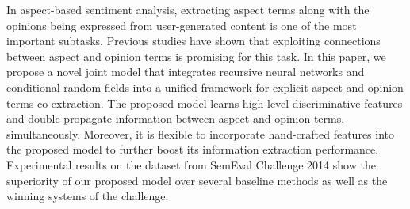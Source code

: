 In aspect-based sentiment analysis, extracting aspect terms along with the opinions being expressed from user-generated content is one of the most important subtasks. Previous studies have shown that exploiting connections between aspect and opinion terms is promising for this task. In this paper, we propose a novel joint model that integrates recursive neural networks and conditional random fields into a unified framework for explicit aspect and opinion terms co-extraction. The proposed model learns high-level discriminative features and double propagate information between aspect and opinion terms, simultaneously. Moreover, it is flexible to incorporate hand-crafted features into the proposed model to further boost its information extraction performance. Experimental results on the dataset from SemEval Challenge 2014 show the superiority of our proposed model over several baseline methods as well as the winning systems of the challenge.
